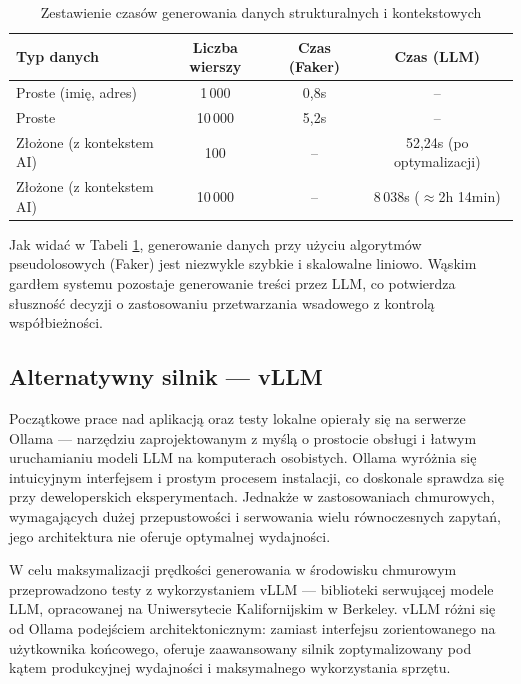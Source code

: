 \begin{table}[H]
    \centering
    \begin{tabular}{|l|c|c|c|}
        \hline
        \textbf{Typ danych}       & \textbf{Liczba wierszy} & \textbf{Czas (Faker)} & \textbf{Czas (\gls{LLM})}   \\
        \hline
        Proste (imię, adres)      & 1\,000                  & 0,8s                  & --                          \\
        \hline
        Proste                    & 10\,000                 & 5,2s                  & --                          \\
        \hline
        Złożone (z kontekstem AI) & 100                     & --                    & 52,24s (po optymalizacji)   \\
        \hline
        Złożone (z kontekstem AI) & 10\,000                 & --                    & 8\,038s ($\approx$2h 14min) \\
        \hline
    \end{tabular}
    \caption{Zestawienie czasów generowania danych strukturalnych i kontekstowych}
    \label{tab:performance_tests}
\end{table}

Jak widać w Tabeli \ref{tab:performance_tests}, generowanie danych przy użyciu algorytmów pseudolosowych (Faker) jest niezwykle szybkie i skalowalne liniowo. Wąskim gardłem systemu pozostaje generowanie treści przez \gls{LLM}, co potwierdza słuszność decyzji o zastosowaniu przetwarzania wsadowego z kontrolą współbieżności.

\subsection*{Alternatywny silnik --- vLLM}
Początkowe prace nad aplikacją oraz testy lokalne opierały się na serwerze Ollama \cite{ollama} --- narzędziu zaprojektowanym z myślą o prostocie obsługi i łatwym uruchamianiu modeli LLM na komputerach osobistych. Ollama wyróżnia się intuicyjnym interfejsem i prostym procesem instalacji, co doskonale sprawdza się przy deweloperskich eksperymentach. Jednakże w zastosowaniach chmurowych, wymagających dużej przepustowości i serwowania wielu równoczesnych zapytań, jego architektura nie oferuje optymalnej wydajności.

W celu maksymalizacji prędkości generowania w środowisku chmurowym przeprowadzono testy z wykorzystaniem vLLM \cite{vllm} --- biblioteki serwującej modele LLM, opracowanej na Uniwersytecie Kalifornijskim w Berkeley. vLLM różni się od Ollama podejściem architektonicznym: zamiast interfejsu zorientowanego na użytkownika końcowego, oferuje zaawansowany silnik zoptymalizowany pod kątem produkcyjnej wydajności i maksymalnego wykorzystania sprzętu.

